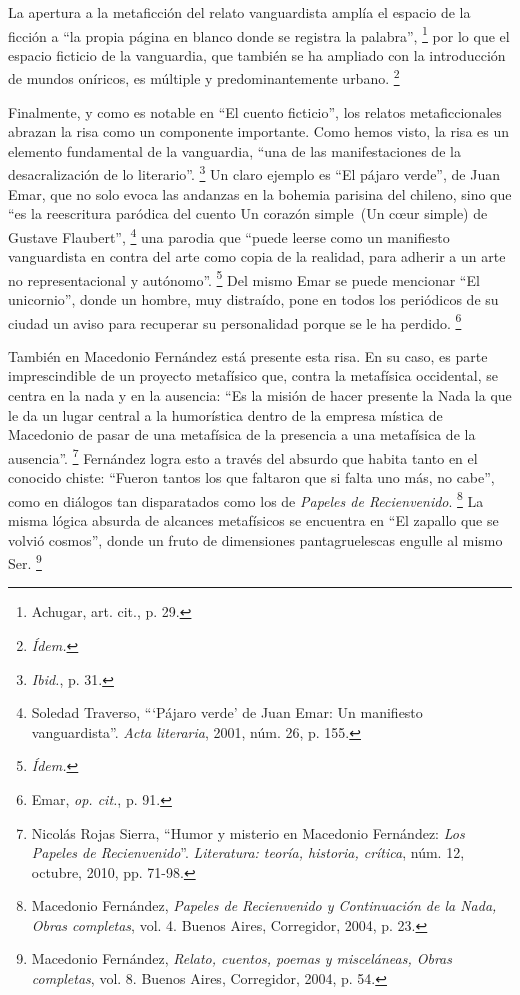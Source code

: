 \documentclass[14pt,twoside,final]{extbook} %
\let\oldfootnote\footnote
\renewcommand\footnote[1]{%
\oldfootnote{\hspace{1mm}#1}}
\begin{document}
La apertura a la metaficción del relato vanguardista amplía el espacio de la ficción a ``la propia página en blanco donde se registra la palabra'',\footnote{Achugar, art. cit., p. 29.} por lo que el espacio ficticio de la vanguardia, que también se ha ampliado con la introducción de mundos oníricos, es múltiple y predominantemente urbano.\footnote{\em Ídem.}

Finalmente, y como es notable en ``El cuento ficticio'', los relatos metaficcionales abrazan la risa como un componente importante. Como hemos visto, la risa es un elemento fundamental de la vanguardia, ``una de las manifestaciones de la desacralización de lo literario''.\footnote{\emph{Ibid.}, p. 31.} Un claro ejemplo es ``El pájaro verde'', de Juan Emar, que no solo evoca las andanzas en la bohemia parisina del chileno, sino que ``es la reescritura paródica del cuento \textquotesingle\textquotesingle Un corazón simple\textquotesingle\textquotesingle\ (\textquotesingle\textquotesingle Un c\oe ur simple\textquotesingle\textquotesingle) de Gustave Flaubert'',\footnote{Soledad Traverso, ```Pájaro verde' de Juan Emar: Un manifiesto vanguardista''. \emph{Acta literaria}, 2001, núm. 26, p. 155.} una parodia que ``puede leerse como un manifiesto vanguardista en contra del arte como copia de la realidad, para adherir a un arte no representacional y autónomo''.\footnote{\em Ídem.} Del mismo Emar se puede mencionar ``El unicornio'', donde un hombre, muy distraído, pone en todos los periódicos de su ciudad un aviso para recuperar su personalidad porque se le ha perdido.\footnote{Emar, \emph{op. cit.}, p. 91.}

También en Macedonio Fernández está presente esta risa. En su caso, es parte imprescindible de un proyecto metafísico que, contra la metafísica occidental, se centra en la nada y en la ausencia: ``Es la misión de hacer presente la Nada la que le da un lugar central a la humorística dentro de la empresa mística de Macedonio de pasar de una metafísica de la presencia a una metafísica de la ausencia''.\footnote{Nicolás Rojas Sierra, ``Humor y misterio en Macedonio Fernández: \emph{Los Papeles de Recienvenido}''. \emph{Literatura: teoría, historia, crítica}, núm. 12, octubre, 2010, pp. 71-98.} Fernández logra esto a través del absurdo que habita tanto en el conocido chiste: ``Fueron tantos los que faltaron que si falta uno más, no cabe'', como en diálogos tan disparatados como los de \emph{Papeles de Recienvenido}.\footnote{Macedonio Fernández, \emph{Papeles de Recienvenido y Continuación de la Nada, Obras completas}, vol. 4. Buenos Aires, Corregidor, 2004, p. 23.} La misma lógica absurda de alcances metafísicos se encuentra en ``El zapallo que se volvió cosmos'', donde un fruto de dimensiones pantagruelescas engulle al mismo Ser.\footnote{Macedonio Fernández, \emph{Relato, cuentos, poemas y misceláneas, Obras completas}, vol. 8. Buenos Aires, Corregidor, 2004, p. 54.}
\end{document}
